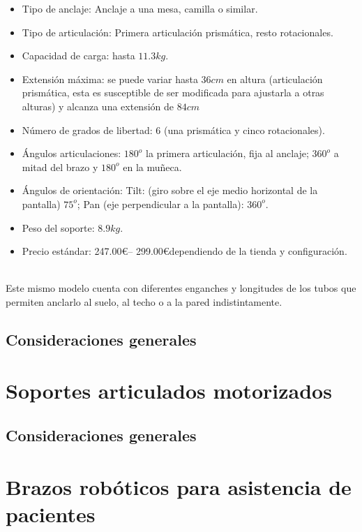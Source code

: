  \begin{minipage}{0.65\textwidth}\raggedright
 	\hspace{1cm}
 	\begin{itemize}
 		\item Tipo de anclaje: Anclaje a una mesa, camilla o similar.
 		\item Tipo de articulación: Primera articulación prismática, resto rotacionales.
 		\item Capacidad de carga: hasta $11.3kg$.
 		\item Extensión máxima: se puede variar hasta $36cm$ en altura (articulación prismática, esta es susceptible de ser modificada para ajustarla a otras alturas) y alcanza una extensión de $84cm$
 		\item Número de grados de libertad: 6 (una prismática y cinco rotacionales).
 		\item Ángulos articulaciones: $180^o$ la primera articulación, fija al anclaje; $360^o$ a mitad del brazo y $180^o$ en la muñeca.
 		\item Ángulos de orientación: Tilt: (giro sobre el eje medio horizontal de la pantalla) $75^o$; Pan (eje perpendicular a la pantalla): $360^o$.
 		\item Peso del soporte: $8.9kg$.
 		\item Precio estándar: 247.00\euro – 299.00\euro dependiendo de la tienda y configuración.
 	\end{itemize}
 \end{minipage}
 \\

 \vspace{0.1cm}
 Este mismo modelo cuenta con diferentes enganches y longitudes de los tubos que permiten anclarlo al suelo, al techo o a la pared indistintamente.

 \subsection{Consideraciones generales}


\section{Soportes articulados motorizados}
 \subsection{Consideraciones generales}

\section{Brazos robóticos para asistencia de pacientes}

